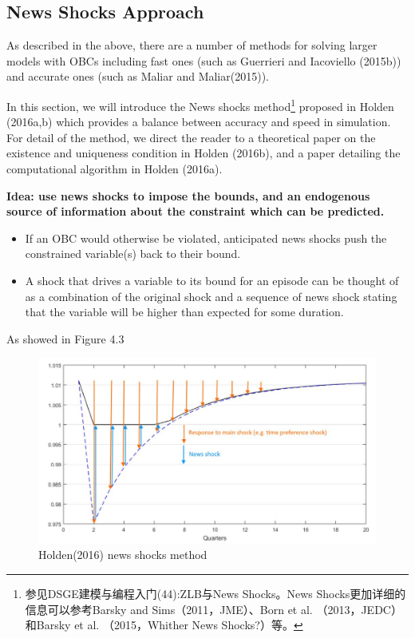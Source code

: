 \documentclass[cn,10pt,math=newtx,citestyle=gb7714-2015,bibstyle=gb7714-2015]{elegantbook}
\begin{document}
\subsection{News Shocks Approach}

As described in the above, there are a number of methods for solving larger models with OBCs including fast ones (such as Guerrieri and Iacoviello (2015b)) and accurate ones (such as Maliar and Maliar(2015)).

In this section, we will introduce the News shocks method\footnote{参见DSGE建模与编程入门(44):ZLB与News Shocks。News Shocks更加详细的信息可以参考Barsky and Sims（2011，JME）、Born et al. （2013，JEDC）和Barsky et al. （2015，Whither News Shocks?）等。} proposed in Holden (2016a,b) which provides a balance between accuracy and speed in simulation. For detail of the method, we direct the reader to a theoretical paper on the existence and uniqueness condition in Holden (2016b), and a paper detailing the computational algorithm in Holden (2016a).

\textbf{Idea: use news shocks to impose the bounds, and an endogenous source of information about the constraint which can be predicted.}

\begin{itemize}
	\item If an OBC would otherwise be violated, anticipated news shocks push the constrained variable(s) back to their bound.
	\item A shock that drives a variable to its bound for an episode can be thought of as a combination of the original shock and a sequence of news shock stating that the variable will be higher than expected for some duration.
\end{itemize}

As showed in Figure 4.3

\begin{figure}[htbp!]
	\centering
	\includegraphics[width=0.8\linewidth]{FIG/newsshock}
	\caption{Holden(2016) news shocks method}\label{4.3}
	\centering
\end{figure}
\end{document}
